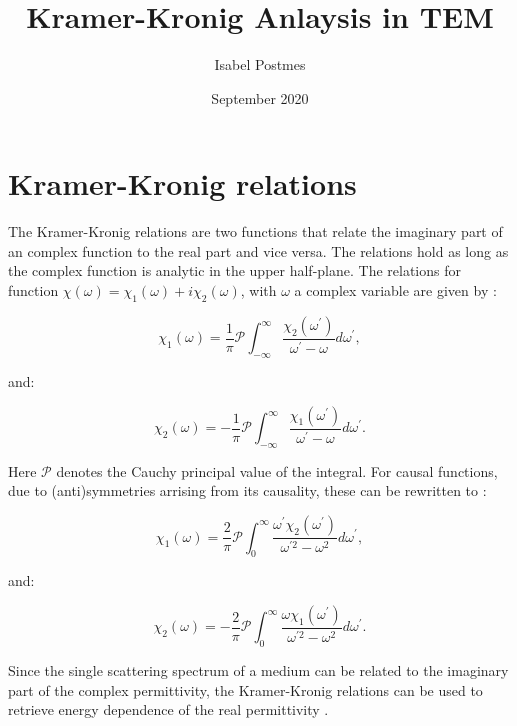 \documentclass{article}
\title{Kramer-Kronig Anlaysis in TEM}
\author{Isabel Postmes }
\date{September 2020}
\begin{document}
\maketitle

\section{Kramer-Kronig relations}
The Kramer-Kronig relations are two functions that relate the imaginary part of an complex function to the real part and vice versa. The relations hold as long as the complex function is analytic in the upper half-plane.
The relations for function $\chi(\omega)=\chi_{1}(\omega)+i \chi_{2}(\omega)$, with $\omega$ a complex variable are given by \cite{wikipedia_2020}:

\begin{equation}
    \chi_{1}(\omega)=\frac{1}{\pi} \mathcal{P} \int_{-\infty}^{\infty} \frac{\chi_{2}\left(\omega^{\prime}\right)}{\omega^{\prime}-\omega} d \omega^{\prime},
\end{equation}

and:

\begin{equation}
    \chi_{2}(\omega)=-\frac{1}{\pi} \mathcal{P} \int_{-\infty}^{\infty} \frac{\chi_{1}\left(\omega^{\prime}\right)}{\omega^{\prime}-\omega} d \omega^{\prime}.
\end{equation}

Here $\mathcal{P}$ denotes the Cauchy principal value of the integral. For causal functions, due to (anti)symmetries arrising from its causality, these can be rewritten to \cite{wikipedia_2020}:

\begin{equation}\label{eq_ch1_1}
    \chi_{1}(\omega)=\frac{2}{\pi} \mathcal{P} \int_{0}^{\infty} \frac{\omega^{\prime} \chi_{2}\left(\omega^{\prime}\right)}{\omega^{\prime 2}-\omega^{2}} d \omega^{\prime},
\end{equation}

and:

\begin{equation}
    \chi_{2}(\omega)=-\frac{2}{\pi} \mathcal{P} \int_{0}^{\infty} \frac{\omega \chi_{1}\left(\omega^{\prime}\right)}{\omega^{\prime 2}-\omega^{2}} d \omega^{\prime}.
\end{equation}


Since the single scattering spectrum of a medium can be related to the imaginary part of the complex permittivity, the Kramer-Kronig relations can be used to retrieve energy dependence of the real permittivity \cite{egerton_2011}. 
\end{document}

